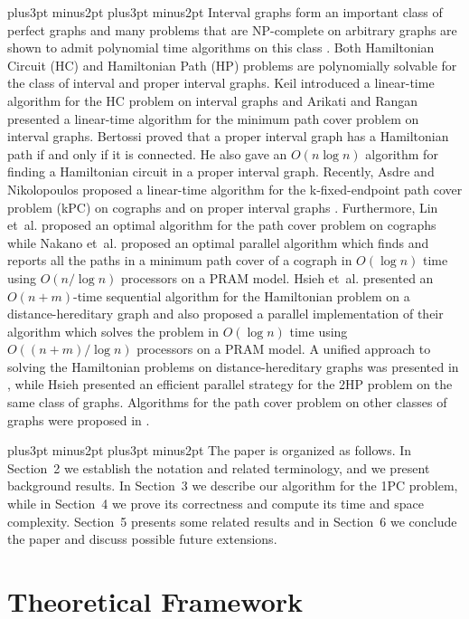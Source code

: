 \documentclass[10pt]{article}
\def\yskip{\penalty-50\vskip3pt plus3pt minus2pt}
\def\yy{\yskip\yskip}
\begin{document}
\yy{} Interval graphs form an important
class of perfect graphs \cite{Gol} and many problems that are
NP-complete on arbitrary graphs are shown to admit polynomial time
algorithms on this class \cite{AR90, Gol, Keil}. Both Hamiltonian
Circuit (HC) and Hamiltonian Path (HP) problems are polynomially
solvable for the class of interval and proper interval graphs.
Keil introduced a linear-time algorithm for the HC problem on
interval graphs \cite{Keil} and Arikati and Rangan \cite{AR90}
presented a linear-time algorithm for the minimum path cover
problem on interval graphs. Bertossi \cite{Bertossi} proved that a
proper interval graph has a Hamiltonian path if and only if it is
connected. He also gave an $O(n\log n)$ algorithm for finding a
Hamiltonian circuit in a proper interval graph. Recently, Asdre
and Nikolopoulos proposed a linear-time algorithm for the
k-fixed-endpoint path cover problem (kPC) on cographs and on
proper interval graphs \cite{AsdNik, AsdNik2}. Furthermore, Lin
et~al. \cite{LiOlPru95} proposed an optimal algorithm for the path
cover problem on cographs while Nakano et~al. \cite{NaOlZo03}
proposed an optimal parallel algorithm which finds and reports all
the paths in a minimum path cover of a cograph in $O(\log n)$ time
using $O(n/\log n)$ processors on a PRAM model. Hsieh et~al.
\cite{HsiehHoHsuKo} presented an $O(n+m)$-time sequential
algorithm for the Hamiltonian problem on a distance-hereditary
graph and also proposed a parallel implementation of their
algorithm which solves the problem in $O(\log n)$ time using
$O((n+m)/\log n)$ processors on a PRAM model. A unified approach
to solving the Hamiltonian problems on distance-hereditary graphs
was presented in \cite{HungChangDH}, while Hsieh \cite{Hsieh}
presented an efficient parallel strategy for the 2HP problem on
the same class of graphs. Algorithms for the path cover problem on
other classes of graphs were proposed in \cite{HungChangCA, Nik,
SSSR93}.

\yy{} The paper is organized as follows. In
Section~2 we establish the notation and related terminology, and
we present background results. In Section~3 we describe our
algorithm for the 1PC problem, while in Section~4 we prove its
correctness and compute its time and space complexity. Section~5
presents some related results and in Section~6 we conclude the
paper and discuss possible future extensions.



\section{Theoretical Framework}
\end{document}
